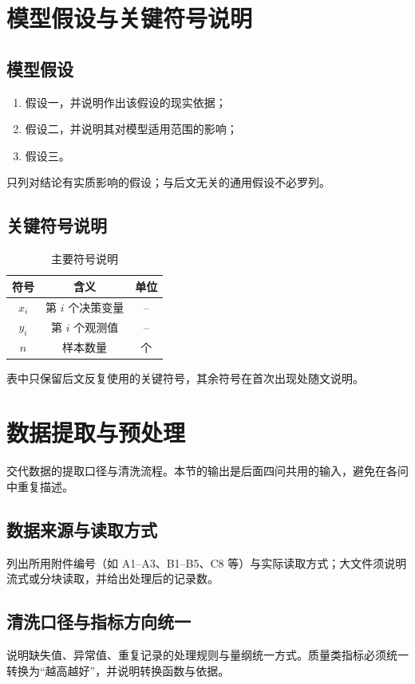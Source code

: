 \documentclass{huawei-cup}
\begin{document}
\section{模型假设与关键符号说明}
\subsection{模型假设}
\begin{enumerate}[label=\arabic*.,leftmargin=2em,itemsep=0pt]
  \item 假设一，并说明作出该假设的现实依据；
  \item 假设二，并说明其对模型适用范围的影响；
  \item 假设三。\label{assumption:three}
\end{enumerate}
只列对结论有实质影响的假设；与后文无关的通用假设不必罗列。

\subsection{关键符号说明}
\begin{table}[H]
  \centering
  \caption{主要符号说明}
  \label{tab:symbols}
  \begin{tabular}{ccc}
    \toprule
    符号 & 含义 & 单位 \\
    \midrule
    $x_i$ & 第 $i$ 个决策变量 & -- \\
    $y_i$ & 第 $i$ 个观测值 & -- \\
    $n$   & 样本数量 & 个 \\
    \bottomrule
  \end{tabular}
\end{table}
表中只保留后文反复使用的关键符号，其余符号在首次出现处随文说明。

\section{数据提取与预处理}
交代数据的提取口径与清洗流程。本节的输出是后面四问共用的输入，避免在各问中重复描述。

\subsection{数据来源与读取方式}
列出所用附件编号（如 A1--A3、B1--B5、C8 等）与实际读取方式；大文件须说明流式或分块读取，并给出处理后的记录数。

\subsection{清洗口径与指标方向统一}
说明缺失值、异常值、重复记录的处理规则与量纲统一方式。质量类指标必须统一转换为“越高越好”，并说明转换函数与依据\cite{ref-journal}。
\end{document}
